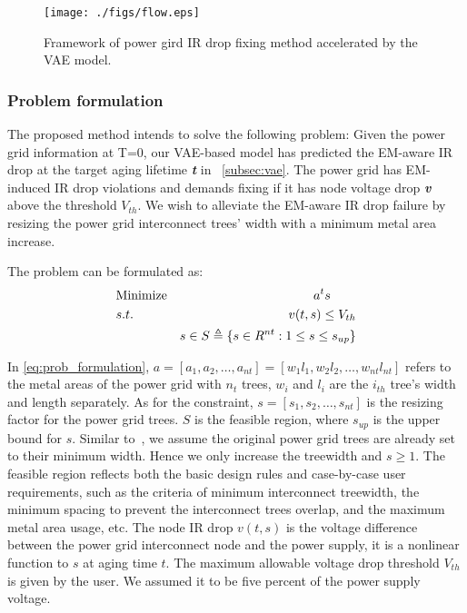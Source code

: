 \begin{figure}[h!]
	\centering
	\texttt{[image: ./figs/flow.eps]}
	\caption{Framework of power gird IR drop fixing method accelerated by the VAE model.}
	\label{fig:flow}
\end{figure}

\subsubsection{Problem formulation}
\label{subsubsec:formulation}
The proposed method intends to solve the following problem: 
Given the power grid information at T=0, our VAE-based model has predicted the EM-aware IR drop at the target aging lifetime \textit{\textbf{t}} in ~\ref{subsec:vae}. The power grid has EM-induced IR drop violations and demands fixing if it has node voltage drop \textit{\textbf{v}}  above the threshold $V_{th}$.
We wish to alleviate the EM-aware IR drop failure by resizing the power grid interconnect trees' width with a minimum metal area increase.

The problem can be formulated as:
\begin{align}
	\label{eq:prob_formulation}
	&\mbox{Minimize}  & a^{t}s \qquad   \notag  \\
	&s.t.     & v(t,s)\leq V_{th} \\
	& \quad   &s \in S   \triangleq \{ s \in R^{nt}: 1 \leq s \leq s_{up} \}        \notag
\end{align}

In \eqref{eq:prob_formulation}, $a=[a_{1},a_{2},\ldots,a_{nt}] = [w_{1}l_{1},w_{2}l_{2},\ldots,w_{nt}l_{nt}]$ refers to the metal areas of the power grid with $n_{t}$ trees, $w_{i}$ and $l_{i}$ are the $i_{th}$ tree's width and length separately.
As for the constraint, $s=[s_{1},s_{2},\ldots,s_{nt}]$  is the resizing factor for the power grid trees. $S$ is the feasible region, where $s_{up}$ is the upper bound for $s$. Similar to~\cite{Sukharev:2019pg}, we assume the original power grid trees are already set to their minimum width. Hence we only increase the treewidth and $s \geq 1 $.
The feasible region reflects both the basic design rules and case-by-case user requirements, such as the criteria of minimum interconnect treewidth, the minimum spacing to prevent the interconnect trees overlap, and the maximum metal area usage, etc. 
The node IR drop $v(t,s)$ is the voltage difference between the power grid interconnect node and the power supply, it is a nonlinear function to $s$ at aging time $t$. The maximum allowable voltage drop threshold $V_{th}$ is given by the user. We assumed it to be five percent of the power supply voltage.


